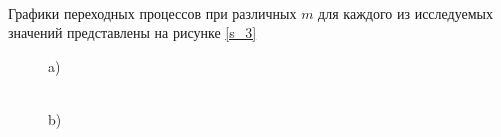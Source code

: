 \documentclass[a4paper,12pt]{article}
\begin{document}
		
			\paragraph {} Графики переходных процессов при различных $m$ для каждого из исследуемых значений представлены на рисунке \ref{s_3}\\
		
		\begin{figure}[h!]
			\renewcommand{\figurename}{Рисунок}
			\begin{minipage}[h]{0.47\linewidth}
				 a) \\
			\end{minipage}
			\hfill
			\begin{minipage}[h]{0.47\linewidth}
				 \\b)

\end{minipage}
\end{figure}
\end{document}
